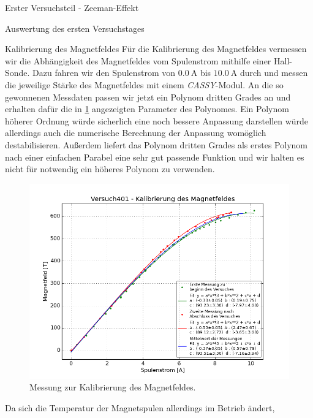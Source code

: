 \documentclass[pdftex, a4paper,11pt, twoside, ngerman]{report}
\begin{document}
\begin{chapter}{Erster Versuchsteil - Zeeman-Effekt}
\begin{section}{Auswertung des ersten Versuchstages}
      \begin{subsection}{Kalibrierung des Magnetfeldes}
        \label{chp:Zeeman:sec:AuswertungMagnetfeld}
        Für die Kalibrierung des Magnetfeldes vermessen wir die Abhängigkeit
        des Magnetfeldes vom Spulenstrom mithilfe einer Hall-Sonde. Dazu fahren
        wir den Spulenstrom von $\SI{0.0}{\ampere}$ bis $\SI{10.0}{\ampere}$
        durch und messen die jeweilige Stärke des Magnetfeldes mit einem
        \textit{CASSY}-Modul. An die so gewonnenen Messdaten passen wir jetzt
        ein Polynom dritten Grades an und erhalten dafür die in
        \cref{fig:MagnetfeldKalibrierung} angezeigten Parameter des Polynomes.
        Ein Polynom höherer Ordnung würde sicherlich eine noch bessere
        Anpassung darstellen würde allerdings auch die numerische Berechnung der
        Anpassung womöglich destabilisieren. Außerdem liefert das Polynom
        dritten Grades als erstes Polynom nach einer einfachen Parabel eine sehr
        gut passende Funktion und wir halten es nicht für notwendig ein höheres
        Polynom zu verwenden.
        \begin{figure}[ht]
          \centering
          \includegraphics[width=\textwidth]
              {Figures/Versuch401-KalibrierungdesMagnetfeldes.png}
          \caption{Messung zur Kalibrierung des Magnetfeldes.}
          \label{fig:MagnetfeldKalibrierung}
        \end{figure}
        \newline
        Da sich die Temperatur der Magnetspulen allerdings im Betrieb ändert,

\end{subsection}
\end{section}
\end{chapter}
\end{document}
